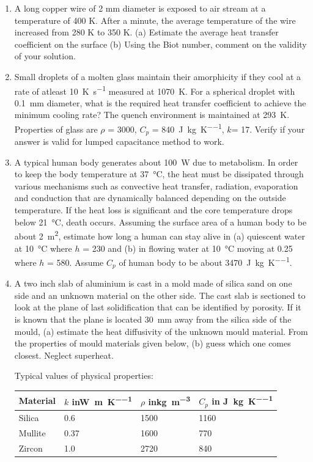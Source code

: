 \begin{enumerate}
 \item A long copper wire of 2 mm diameter is exposed to air stream at a
temperature of 400 K. After a minute, the average temperature of the wire
increased from 280 K to 350 K. (a) Estimate the average heat transfer
coefficient on the surface (b) Using the Biot number, comment on the validity of
your solution.

\item Small droplets of a molten glass maintain their amorphicity if they cool
at a rate of atleast \SI{10}{\kelvin\per\second} measured at \SI{1070}{\kelvin}.
For a spherical droplet with \SI{0.1}{\mm} diameter, what is the required heat
transfer coefficient to achieve the minimum cooling rate? The quench environment
is maintained at \SI{293}{\kelvin}. Properties of glass are $\rho$ =
\SI{3000}{\kgpmc}, $C_p$ = \SI{840}{\joule\per\kilo\gram\per\kelvin}, $k$=
\SI{17}{\wpmk}. Verify if your answer is valid for lumped capacitance method to
work.

 \item A typical human body generates about \SI{100}{\watt} due to metabolism.
In order to keep the body temperature at \SI{37}{\celsius}, the heat must be
dissipated through various mechanisms such as convective heat transfer,
radiation, evaporation and conduction that are dynamically balanced depending on
the outside temperature. If the heat loss is significant and the core
temperature drops below \SI{21}{\celsius}, death occurs. Assuming the surface
area of a human body to be about \SI{2}{\meter\squared}, estimate how long a
human can stay alive in (a) quiescent water at \SI{10}{\celsius} where $h$ =
\SI{230}{\wpmsk} and (b) in flowing water at \SI{10}{\celsius} moving at
\SI{0.25}{\mps} where $h$ = \SI{580}{\wpmsk}. Assume $C_p$ of human body to be
about \SI{3470}{\joule\per\kilo\gram\per\kelvin}.

 \item A two inch slab of aluminium is cast in a mold made of silica sand on one
side and an unknown material on the other side. The cast slab is sectioned to
look at the plane of last solidification that can be identified by porosity. If
it is known that the plane is located \SI{30}{\milli\metre} away from the silica side of
the mould, (a) estimate the heat diffusivity of the unknown mould material. From
the properties of mould materials given below, (b) guess which one comes
closest. Neglect superheat.


Typical values of physical properties:\\
\begin{tabular}{|l|l|l|l|}
\hline
Material & $k$ in\si{\watt\per\metre\per\kelvin} & $\rho$
in\si{\kilo\gram\per\metre\cubed} & $C_p$ in
\si{\joule\per\kilo\gram\per\kelvin} \\
\hline
Silica & 0.6 & 1500 & 1160  \\
Mullite & 0.37 & 1600 & 770  \\
Zircon & 1.0 & 2720 & 840  \\
\hline
\end{tabular}




\end{enumerate}
